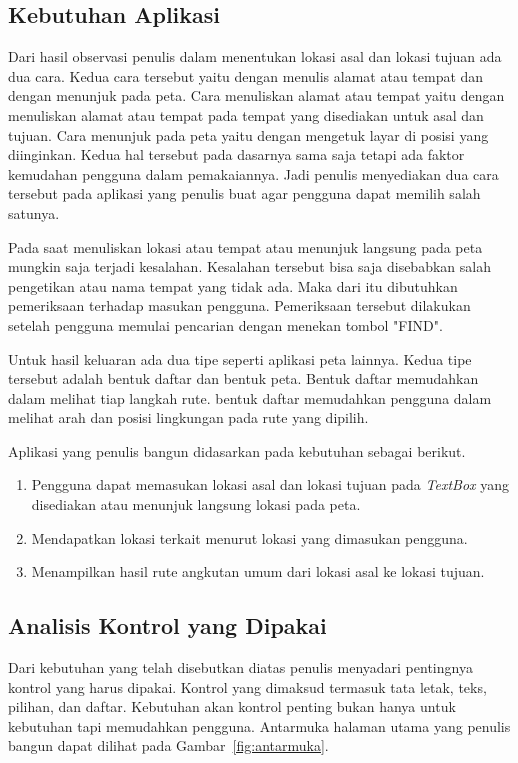 \subsection{Kebutuhan Aplikasi}
\label{lab:Kebutuhan Aplikasi}
\hspace{0.5cm} Dari hasil observasi penulis dalam menentukan lokasi asal dan lokasi tujuan ada dua cara. Kedua cara tersebut yaitu dengan menulis alamat atau tempat dan dengan menunjuk pada peta. Cara menuliskan alamat atau tempat yaitu dengan menuliskan alamat atau tempat pada tempat yang disediakan untuk asal dan tujuan. Cara menunjuk pada peta yaitu dengan mengetuk layar di posisi yang diinginkan. Kedua hal tersebut pada dasarnya sama saja tetapi ada faktor kemudahan pengguna dalam pemakaiannya. Jadi penulis menyediakan dua cara tersebut pada aplikasi yang penulis buat agar pengguna dapat memilih salah satunya.

\hspace{0.5cm} Pada saat menuliskan lokasi atau tempat atau menunjuk langsung pada peta mungkin saja terjadi kesalahan. Kesalahan tersebut bisa saja disebabkan salah pengetikan atau nama tempat yang tidak ada. Maka dari itu dibutuhkan pemeriksaan terhadap masukan pengguna. Pemeriksaan tersebut dilakukan setelah pengguna memulai pencarian dengan menekan tombol "FIND".

\hspace{0.5cm} Untuk hasil keluaran ada dua tipe seperti aplikasi peta lainnya. Kedua tipe tersebut adalah bentuk daftar dan bentuk peta. Bentuk daftar memudahkan dalam melihat tiap langkah rute. bentuk daftar memudahkan pengguna dalam melihat arah dan posisi lingkungan pada rute yang dipilih.

\hspace{0.5cm} Aplikasi yang penulis bangun didasarkan pada kebutuhan sebagai berikut.
\begin{enumerate}
	\item Pengguna dapat memasukan lokasi asal dan lokasi tujuan pada \textit{TextBox} yang disediakan atau menunjuk langsung lokasi pada peta.
	\item Mendapatkan lokasi terkait menurut lokasi yang dimasukan pengguna.
	\item Menampilkan hasil rute angkutan umum dari lokasi asal ke lokasi tujuan.
\end{enumerate}

\subsection{Analisis Kontrol yang Dipakai}
\label{lab:Analisis Kontrol yang Dipakai}
\hspace{0.5cm} Dari kebutuhan yang telah disebutkan diatas penulis menyadari pentingnya kontrol yang harus dipakai. Kontrol yang dimaksud termasuk tata letak, teks, pilihan, dan daftar. Kebutuhan akan kontrol penting bukan hanya untuk kebutuhan tapi memudahkan pengguna. Antarmuka halaman utama yang penulis bangun dapat dilihat pada Gambar~\ref{fig:antarmuka}. 

